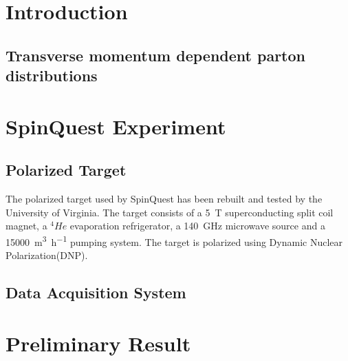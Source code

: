 \section{Introduction}

\subsection{Transverse momentum dependent parton distributions}

\section{SpinQuest Experiment}

\subsection{Polarized Target}
The polarized target used by SpinQuest has been rebuilt and tested by the 
University of Virginia. The target consists of a \SI{5}{T} superconducting 
split coil magnet, a ${}^4He$  evaporation refrigerator, a \SI{140}{\GHz} 
microwave source and a \SI{15000}{\meter^{3}\per\hour} pumping system. The 
target is polarized using Dynamic Nuclear Polarization(DNP)\cite{crabb1995}.


\subsection{Data Acquisition System}

\section{Preliminary Result}
